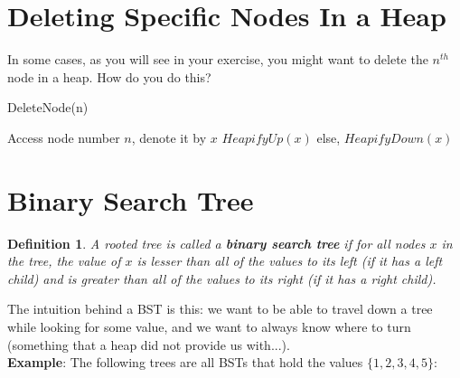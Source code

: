 \documentclass[12pt]{article}
\newtheorem{definition}{Definition} \newtheorem{remark}{Remark}
\begin{document}
\section{Deleting Specific Nodes In a Heap}

In some cases, as you will see in your exercise, you might want to delete the $n^{th}$ node in a heap. 
How do you do this?


\begin{algorithm}
\caption{DeleteNode(n)}
\begin{algorithmic}[1]
\State Access node number $n$, denote it by $x$
    \State $HeapifyUp(x)$
\EndIf
else, 
    \State $HeapifyDown(x)$
\EndIf
\end{algorithmic}
\end{algorithm} 


\section{Binary Search Tree}
\begin{definition}
A rooted tree is called a \textbf{binary search tree} if for all nodes $x$ in the tree, the value of $x$ is lesser than all of the values to its left (if it has a left child) and is greater than all of the values to its right (if it has a right child). 
\end{definition}

The intuition behind a BST is this: we want to be able to travel down a tree while looking for some value, and we want to always know where to turn (something that a heap did not provide us with...). \\

\textbf{Example}: The following trees are all BSTs that hold the values $\{1,2,3,4,5\}$:\\
 \\

\\
\end{document}
